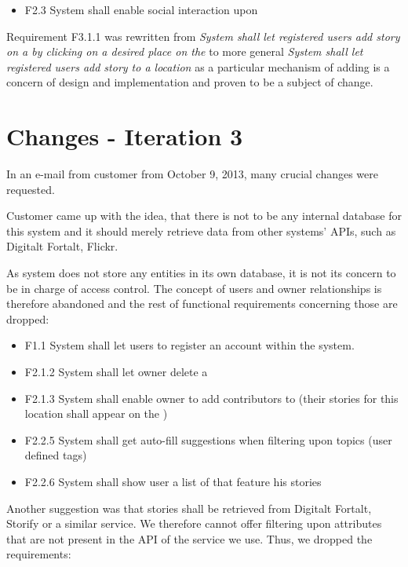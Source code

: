 \documentclass[11pt]{book}
\begin{document}
\begin{itemize}
  \item F2.3 System shall enable social interaction upon \wallentityp
\end{itemize}

Requirement F3.1.1 was rewritten from \emph{System shall let registered users add story on a \wallentitys by clicking on a desired place on the \wallentitys} to more general \emph{System shall let registered users add story to a location} as a particular mechanism of adding \wallentityp is a concern of design and implementation and proven to be a subject of change.

\section{Changes - Iteration 3}\label{changes---iteration-3}

In an e-mail from customer from October 9, 2013, many crucial changes
were requested.

Customer came up with the idea, that there is not to be any internal database for this system and it should merely retrieve data from other systems' APIs, such as Digitalt Fortalt, Flickr.

As system does not store any entities in its own database, it is not its concern to be in charge of access control. The concept of users and owner relationships is therefore abandoned and the rest of functional requirements concerning those are dropped:

\begin{itemize}
  \item F1.1 System shall let users to register an account within the system.
  \item F2.1.2 System shall let owner delete a \wallentitys
  \item F2.1.3 System shall enable owner to add contributors to \wallentitys (their
  stories for this location shall appear on the \wallentitys)
  \item F2.2.5 System shall get auto-fill suggestions when filtering upon
  topics (user defined tags)
  \item F2.2.6 System shall show user a list of \wallentityp that feature his stories
\end{itemize}

Another suggestion was that stories shall be retrieved from Digitalt Fortalt, Storify or a similar service. We therefore cannot offer filtering upon attributes that are not present in the API of the service we use. Thus, we dropped the requirements:
\end{document}
